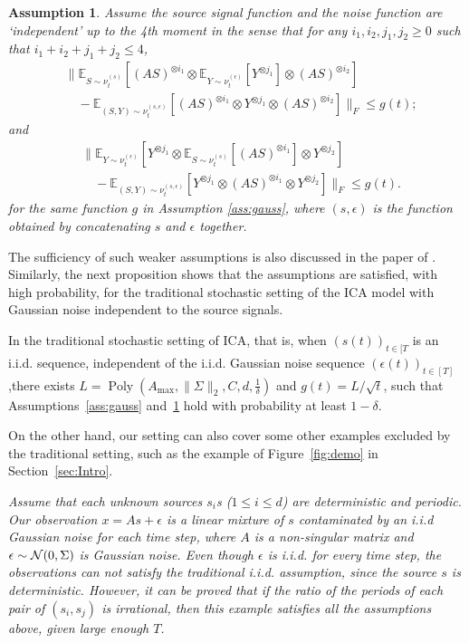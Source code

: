 \documentclass[twoside,11pt]{article}
\newcommand{\cN}{\cal{N}}
\newcommand{\E}{\mathbb{E}}
\newcommand{\iid}{i.i.d.\xspace}
\DeclareMathOperator{\pol}{Poly}
\newcommand{\poly}[1]{\pol\left(#1\right)}
\newtheorem{assumption}{Assumption}
\newcommand{\eps}{\epsilon}
\begin{document}
\begin{assumption}
\label{ass:independence}
Assume the source signal function and the noise function are `independent' up to the 4th moment in the sense that for any $i_1,i_2,j_1,j_2 \ge 0$ such that $i_1+i_2+j_1+j_2 \le 4$,  
\begin{align*}
& \| \E_{S\sim \nu_t^{(s)}} [(AS)^{\otimes i_1}\otimes \E_{Y\sim \nu_t^{(\epsilon)}} [Y^{\otimes j_1}] \otimes (AS)^{\otimes i_2}]\\
& \quad - \E_{(S, Y)\sim \nu_t^{(s, \epsilon)}} [(AS)^{\otimes i_1}\otimes Y^{\otimes j_1}\otimes (AS)^{\otimes i_2}]  \|_F 
 \le g(t); %
\end{align*}
and 
\begin{align*}
& \| \E_{Y\sim \nu_t^{(\epsilon)}} [Y^{\otimes j_1} \otimes \E_{S\sim \nu_t^{(s)}} [(AS)^{\otimes i_1}] \otimes Y^{\otimes j_2}] \\
& \quad - \E_{(S, Y)\sim \nu_t^{(s, \epsilon)}} [ Y^{\otimes j_1}\otimes (AS)^{\otimes i_1}\otimes Y^{\otimes j_2}] \|_F 
\le g(t). %
\end{align*}
for the same function $g$ in Assumption \ref{ass:gauss}, where $(s,\epsilon)$ is the function obtained by concatenating $s$ and $\epsilon$ together.  
\end{assumption}
The sufficiency of such weaker assumptions is also discussed in the paper of \citet{frieze1996learning}.
Similarly, the next proposition shows that the assumptions are satisfied, with high probability, for the traditional stochastic setting of the ICA model with Gaussian noise independent to the source signals.
\begin{proposition}
\label{prop:stochasticAss}
In the traditional stochastic setting of ICA, that is, when $(s(t))_{t\in[T}$ is an \iid sequence, independent of the \iid Gaussian noise sequence $(\epsilon(t))_{t\in[T]}$,there exists $L = \poly{A_{\max}, \|\Sigma\|_2, C, d,\frac{1}{\delta}}$ and $g(t) = L/\sqrt{t}$, such that Assumptions~\ref{ass:gauss} and~\ref{ass:independence} hold with probability at least $1-\delta$.
\end{proposition}
On the other hand, our setting can also cover some other examples excluded by the traditional setting, such as the example of Figure~\ref{fig:demo} in Section~\ref{sec:Intro}.
\begin{example} \em
Assume that each unknown sources $s_i$s ($1\le i\le d$) are deterministic and periodic. Our observation $x=As+\eps$ is a linear mixture of $s$ contaminated by an i.i.d Gaussian noise for each time step, where $A$ is a non-singular matrix and $\eps\sim {\cN}(0,\Sigma)$ is Gaussian noise.   
Even though $\eps$ is i.i.d. for every time step, the observations can not satisfy the traditional i.i.d. assumption, since the source $s$ is deterministic. However, it can be proved that if the ratio of the periods of each pair of $(s_i, s_j)$ is irrational, then this example satisfies all the assumptions above, given large enough $T$.   
\end{example}
\end{document}
